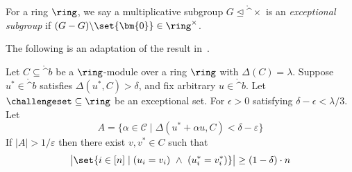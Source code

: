 \begin{definition}
  \label{def:exceptional-subgroup}
  For a ring $\ring$, we say a multiplicative subgroup $G \trianglelefteq \ring^\times$ is an \emph{exceptional subgroup} if $(G-G){\setminus}\set{\bm{0}} \in \ring^{\times}$.
\end{definition}

\noindent The following is an adaptation of the result in~\cite{BKS18}. 

\begin{lemma}
\label{lemma:correlated-agreement}
Let $C \subseteq \ring^b$ be a $\ring$-module over a ring $\ring$ with $\Delta(C) = \lambda$. Suppose $u^\ast \in \ring^b$ satisfies $\Delta(u^\ast,C) > \delta$, and fix arbitrary $u \in \ring^b$. Let $\challengeset \subseteq \ring$ be an exceptional set. For $\epsilon > 0$ satisfying $\delta - \epsilon < \lambda/3$. Let
\[
A = \{\alpha \in \mathcal{C} \mid \Delta(u^\ast + \alpha u, C) < \delta - \varepsilon\}
\]
If $|A| > 1/\varepsilon$ then there exist $v, v^\ast \in C$ such that
\[
\bigl|\set{i \in [n] \mid (u_i = v_i) \ \wedge \ (u^\ast_i = v^\ast_i)}\bigr| \geq (1 - \delta)\cdot n
\]
\end{lemma}

